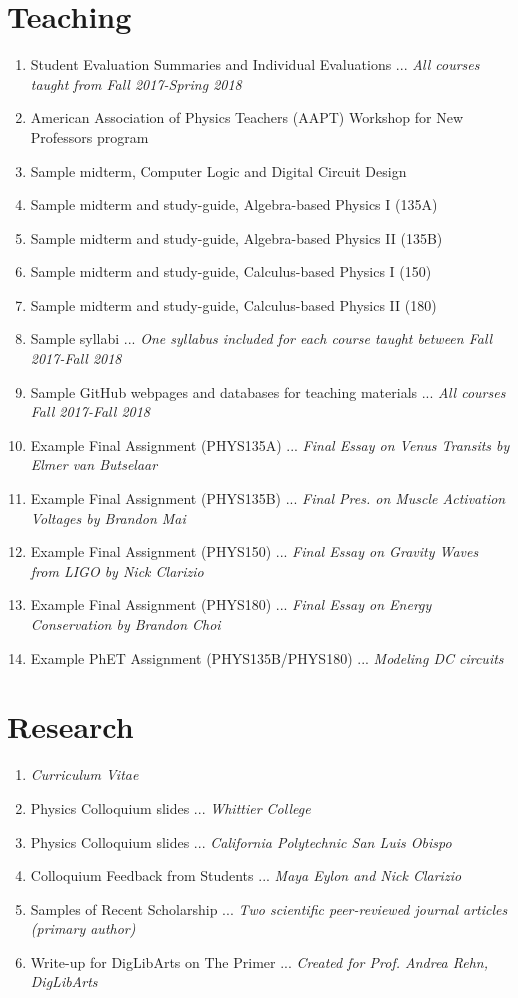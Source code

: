 \documentclass[../../main.tex]{subfiles}
\begin{document}
\section{Teaching}

\begin{enumerate}
\item Student Evaluation Summaries and Individual Evaluations ... \textit{All courses taught from Fall 2017-Spring 2018}
\item American Association of Physics Teachers (AAPT) Workshop for New Professors program
\item Sample midterm, Computer Logic and Digital Circuit Design
\item Sample midterm and study-guide, Algebra-based Physics I (135A)
\item Sample midterm and study-guide, Algebra-based Physics II (135B)
\item Sample midterm and study-guide, Calculus-based Physics I (150)
\item Sample midterm and study-guide, Calculus-based Physics II (180)
\item Sample syllabi ... \textit{One syllabus included for each course taught between Fall 2017-Fall 2018}
\item Sample GitHub webpages and databases for teaching materials ... \textit{All courses Fall 2017-Fall 2018}
\item Example Final Assignment (PHYS135A) ... \textit{Final Essay on Venus Transits by Elmer van Butselaar}
\item Example Final Assignment (PHYS135B) ... \textit{Final Pres. on Muscle Activation Voltages by Brandon Mai}
\item Example Final Assignment (PHYS150) ... \textit{Final Essay on Gravity Waves from LIGO by Nick Clarizio}
\item Example Final Assignment (PHYS180) ... \textit{Final Essay on Energy Conservation by Brandon Choi}\
\item Example PhET Assignment (PHYS135B/PHYS180) ... \textit{Modeling DC circuits}
\end{enumerate}

\section{Research}

\begin{enumerate}
\item \textit{Curriculum Vitae}
\item Physics Colloquium slides ... \textit{Whittier College}
\item Physics Colloquium slides ... \textit{California Polytechnic San Luis Obispo}
\item Colloquium Feedback from Students ... \textit{Maya Eylon and Nick Clarizio}
\item Samples of Recent Scholarship ... \textit{Two scientific peer-reviewed journal articles (primary author)}
\item Write-up for DigLibArts on The Primer ... \textit{Created for Prof. Andrea Rehn, DigLibArts}
\end{enumerate}
\end{document}
